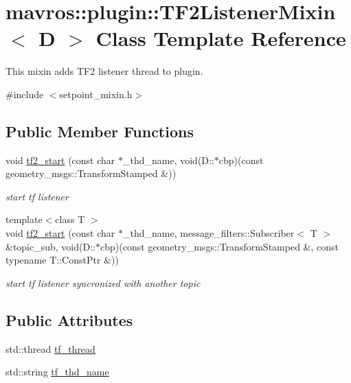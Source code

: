 \hypertarget{classmavros_1_1plugin_1_1TF2ListenerMixin}{}\section{mavros\+::plugin\+::T\+F2\+Listener\+Mixin$<$ D $>$ Class Template Reference}
\label{classmavros_1_1plugin_1_1TF2ListenerMixin}


This mixin adds T\+F2 listener thread to plugin.  




{\ttfamily \#include $<$setpoint\+\_\+mixin.\+h$>$}

\subsection*{Public Member Functions}
\begin{DoxyCompactItemize}
\item 
void \mbox{\hyperlink{group__plugin_ga900fbf118417e6308394b803276bd257}{tf2\+\_\+start}} (const char $\ast$\+\_\+thd\+\_\+name, void(D\+::$\ast$cbp)(const geometry\+\_\+msgs\+::\+Transform\+Stamped \&))
\begin{DoxyCompactList}\small\item\em start tf listener \end{DoxyCompactList}\item 
{\footnotesize template$<$class T $>$ }\\void \mbox{\hyperlink{group__plugin_gab0cf1ee9c93e92fdcabb98e9eba093c5}{tf2\+\_\+start}} (const char $\ast$\+\_\+thd\+\_\+name, message\+\_\+filters\+::\+Subscriber$<$ T $>$ \&topic\+\_\+sub, void(D\+::$\ast$cbp)(const geometry\+\_\+msgs\+::\+Transform\+Stamped \&, const typename T\+::\+Const\+Ptr \&))
\begin{DoxyCompactList}\small\item\em start tf listener syncronized with another topic \end{DoxyCompactList}\end{DoxyCompactItemize}
\subsection*{Public Attributes}
\begin{DoxyCompactItemize}
\item 
std\+::thread \mbox{\hyperlink{group__plugin_ga5ac5c640e09c36aefab3741e96bcd3ab}{tf\+\_\+thread}}
\item 
std\+::string \mbox{\hyperlink{group__plugin_gaff209548a5d3a38bdbf724ba30f9bcbb}{tf\+\_\+thd\+\_\+name}}
\end{DoxyCompactItemize}


